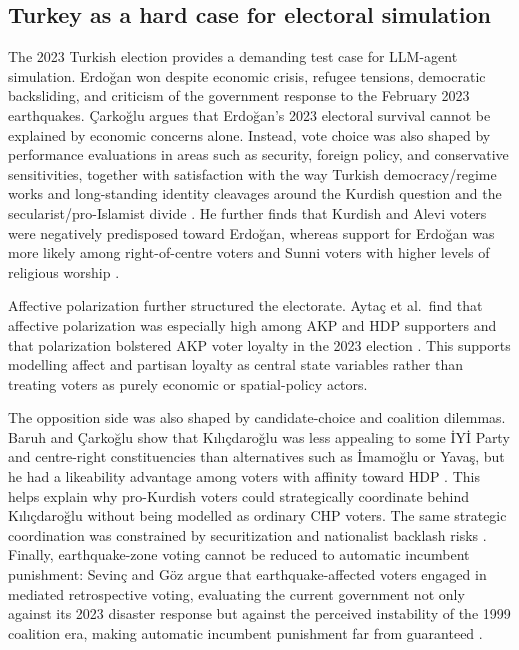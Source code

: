 \documentclass[pdflatex,sn-mathphys-num,iicol]{sn-jnl}
\begin{document}
\subsection{Turkey as a hard case for electoral
simulation}\label{subsec:turkey-hard-case}

The 2023 Turkish election provides a demanding test case for LLM-agent
simulation. Erdoğan won despite economic crisis, refugee tensions, democratic
backsliding, and criticism of the government response to the February 2023
earthquakes. Çarkoğlu argues that Erdoğan's 2023 electoral survival cannot be
explained by economic concerns alone. Instead, vote choice was also shaped by
performance evaluations in areas such as security, foreign policy, and
conservative sensitivities, together with satisfaction with the way Turkish
democracy/regime works and long-standing identity cleavages around the Kurdish
question and the secularist/pro-Islamist divide \cite{carkoglu2024unlikely}. He
further finds that Kurdish and Alevi voters were negatively predisposed toward
Erdoğan, whereas support for Erdoğan was more likely among right-of-centre
voters and Sunni voters with higher levels of religious worship
\cite{carkoglu2024unlikely}.

Affective polarization further structured the electorate. Aytaç et al.\ find
that affective polarization was especially high among AKP and HDP supporters
and that polarization bolstered AKP voter loyalty in the 2023 election
\cite{aytac2025polarised}. This supports modelling affect and partisan loyalty
as central state variables rather than treating voters as purely economic or
spatial-policy actors.

The opposition side was also shaped by candidate-choice and coalition dilemmas.
Baruh and Çarkoğlu show that Kılıçdaroğlu was less appealing to some İYİ Party
and centre-right constituencies than alternatives such as İmamoğlu or Yavaş,
but he had a likeability advantage among voters with affinity toward HDP
\cite{baruh2024difficult}. This helps explain why pro-Kurdish voters could
strategically coordinate behind Kılıçdaroğlu without being modelled as ordinary
CHP voters. The same strategic coordination was constrained by securitization
and nationalist backlash risks \cite{ilbiz2023securitization}. Finally,
earthquake-zone voting cannot be reduced to automatic incumbent punishment:
Sevinç and Göz argue that earthquake-affected voters engaged in mediated
retrospective voting, evaluating the current government not only against its
2023 disaster response but against the perceived instability of the 1999
coalition era, making automatic incumbent punishment far from guaranteed
\cite{sevinc2024afet}.
\end{document}
